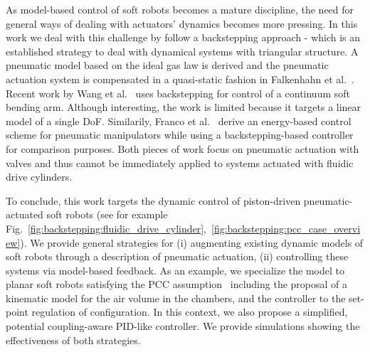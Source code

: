 As model-based control of soft robots becomes a mature discipline, the need for general ways of dealing with actuators' dynamics becomes more pressing. In this work we deal with this challenge by follow a backstepping approach - which is an established strategy to deal with dynamical systems with triangular structure. %
%
A pneumatic model based on the ideal gas law is derived and the pneumatic actuation system is compensated in a quasi-static fashion in Falkenhahn et al.~\cite{falkenhahn2016dynamic}.
%
%
%
Recent work by Wang et al.~\cite{wang2019parameter} uses backstepping for control of a continuum soft bending arm. Although interesting, the work is limited because it targets a linear model of a single DoF.
Similarily, Franco et al.~\cite{franco2021nonlinear} derive an energy-based control scheme for pneumatic manipulators while using a backstepping-based controller for comparison purposes.
% 
Both pieces of work focus on pneumatic actuation with valves and thus cannot be immediately applied to systems actuated with fluidic drive cylinders.

To conclude, this work targets the dynamic control of piston-driven pneumatic-actuated soft robots (see for example Fig.~\ref{fig:backstepping:fluidic_drive_cylinder},~\ref{fig:backstepping:pcc_case_overview}). 
We provide general strategies for (i) augmenting existing dynamic models of soft robots through a description of pneumatic actuation, (ii) controlling these systems via model-based feedback. 
As an example, we specialize the model to planar soft robots satisfying the \gls{PCC} assumption~\cite{della2020model} including the proposal of a kinematic model for the air volume in the chambers, and the controller to the set-point regulation of configuration. In this context, we also propose a simplified, potential coupling-aware PID-like controller. We provide simulations showing the effectiveness of both strategies.

